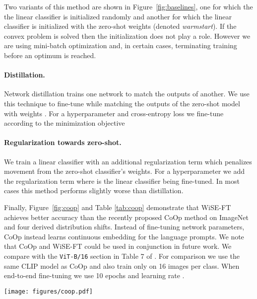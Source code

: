 Two variants of this method are shown in Figure~\ref{fig:baselines}, one for which the the linear classifier is initialized randomly and another for which the linear classifier is initialized with the zero-shot weights (denoted \emph{warmstart}). If the convex problem is solved then the initialization does not play a role. However we are using mini-batch optimization and, in certain cases, terminating training before an optimum is reached. 


\FloatBarrier

\paragraph{Distillation.} Network distillation \cite{hinton2015distilling} trains one network to match the outputs of another.
We use this technique to fine-tune while matching the outputs of the zero-shot model with weights .
For a hyperparameter  and cross-entropy loss  we fine-tune  according to the minimization  objective


\paragraph{Regularization towards zero-shot.} We train a linear classifier with an additional regularization term which penalizes movement from the zero-shot classifier's weights.
For a hyperparameter  we add the regularization term  where  is the linear classifier being fine-tuned.
In most cases this method performs slightly worse than distillation. 






Finally, Figure~\ref{fig:coop} and Table \ref{tab:coop} demonstrate that WiSE-FT achieves better accuracy than the recently proposed CoOp method \cite{coop} on ImageNet and four derived distribution shifts.
Instead of fine-tuning network parameters, CoOp instead learns continuous embedding for the language prompts. We note that CoOp and WiSE-FT could be used in conjunction in future work. We compare with the \texttt{ViT-B/16} section in Table 7 of \citet{coop}. For comparison we use the same CLIP model as CoOp and also train only on 16 images per class. When end-to-end fine-tuning we use 10 epochs and learning rate . 

\begin{figure*}
    \centering
    \texttt{[image: figures/coop.pdf]}
    \caption{Comparing WiSE-FT with CoOp \cite{coop}. Both methods fine-tune the \texttt{ViT-B/16} CLIP model on 16 examples per class of ImageNet.}
    \label{fig:coop}
\end{figure*}

